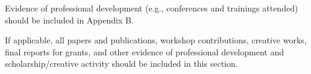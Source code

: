 Evidence of professional development (e.g., conferences and trainings attended) should be included in Appendix B.

If applicable, all papers and publications, workshop contributions, creative works, final reports for grants, and other evidence of professional development and scholarship/creative activity should be included in this section.
